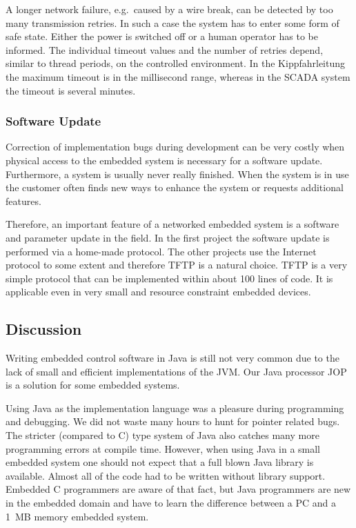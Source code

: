 A longer network failure, e.g.\ caused by a wire break, can be
detected by too many transmission retries. In such a case the system
has to enter some form of safe state. Either the power is switched
off or a human operator has to be informed. The individual timeout
values and the number of retries depend, similar to thread periods,
on the controlled environment. In the Kippfahrleitung the maximum
timeout is in the millisecond range, whereas in the SCADA system the
timeout is several minutes.

\subsubsection{Software Update}

Correction of implementation bugs during development can be very
costly when physical access to the embedded system is necessary for a
software update. Furthermore, a system is usually never really
finished. When the system is in use the customer often finds new ways
to enhance the system or requests additional features.

Therefore, an important feature of a networked embedded system is a
software and parameter update in the field. In the first project the
software update is performed via a home-made protocol. The other
projects use the Internet protocol to some extent and therefore TFTP
is a natural choice. TFTP is a very simple protocol that can be
implemented within about 100 lines of code. It is applicable even in
very small and resource constraint embedded devices.

\subsection{Discussion} \label{sec:lessions}

Writing embedded control software in Java is still not very common
due to the lack of small and efficient implementations of the JVM.
Our Java processor JOP is a solution for some embedded systems.

Using Java as the implementation language was a pleasure during
programming and debugging. We did not waste many hours to hunt for
pointer related bugs. The stricter (compared to C) type system of
Java also catches many more programming errors at compile time.
However, when using Java in a small embedded system one should not
expect that a full blown Java library is available. Almost all of the
code had to be written without library support. Embedded C
programmers are aware of that fact, but Java programmers are new in
the embedded domain and have to learn the difference between a PC and
a 1~MB memory embedded system.


